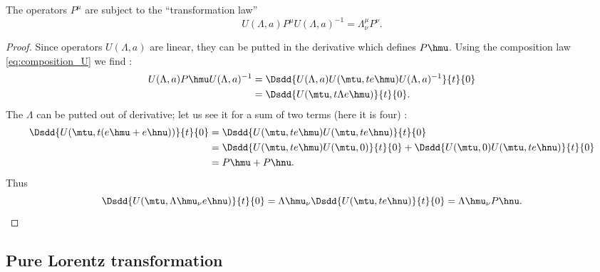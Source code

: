 \begin{proposition}
The operators $P^{\mu}$ are subject to the ``transformation law''
\begin{equation}
   U(\Lambda,a)P^{\mu} U(\Lambda,a)^{-1}=\Lambda^{\mu}_{\nu} P^{\nu}.
\end{equation}
\end{proposition}

\begin{proof}
Since operators $U(\Lambda,a)$ are linear, they can be putted in the derivative which defines $P\hmu$. Using the composition law  \eqref{eq:composition_U} we find :
\begin{equation}
\begin{split}
   U(\Lambda,a)P\hmu U(\Lambda,a)^{-1}&=\Dsdd{ U(\Lambda,a)U(\mtu,te\hmu)U(\Lambda,a)^{-1} }{t}{0}\\
                                     &=\Dsdd{U(\mtu,t\Lambda e\hmu)}{t}{0}.
\end{split}				     
\end{equation}
The $\Lambda$ can be putted out of derivative; let us see it for a sum of two terms (here it is four) :
\begin{equation}
\begin{split}
  \Dsdd{ U(\mtu,t(e\hmu+e\hnu)) }{t}{0}&=\Dsdd{U(\mtu,te\hmu)U(\mtu,te\hnu)}{t}{0}\\
                                      &=\Dsdd{U(\mtu,te\hmu)U(\mtu,0)}{t}{0}
				        +\Dsdd{U(\mtu,0)U(\mtu,te\hnu)}{t}{0}\\
				      &=P\hmu+P\hnu.
\end{split}
\end{equation}
Thus 
\begin{equation}
    \Dsdd{U(\mtu,\Lambda\hmu_{\nu} e\hnu)}{t}{0}=\Lambda\hmu_{\nu}\Dsdd{U(\mtu,te\hnu)}{t}{0}
                                              =\Lambda\hmu_{\nu} P\hnu.
\end{equation}
\end{proof}

\subsection{Pure Lorentz transformation}

